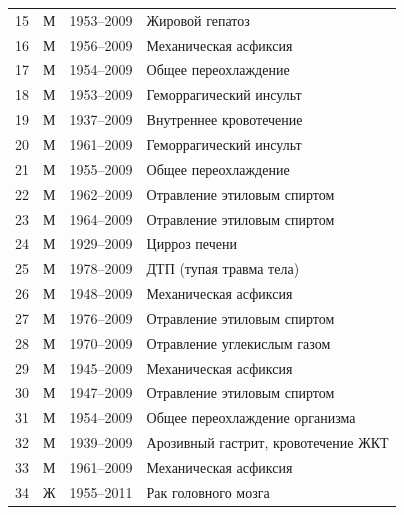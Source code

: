 \begin{table}[p!]
\begin{tabular}{r|c|c|l}
15 & М & 1953--2009 & Жировой гепатоз \\

16 & М & 1956--2009 & Механическая асфиксия \\

17 & М & 1954--2009 & Общее переохлаждение \\

18 & М & 1953--2009 & Геморрагический инсульт \\

19 & М & 1937--2009 & Внутреннее кровотечение \\

20 & М & 1961--2009 & Геморрагический инсульт \\

21 & М & 1955--2009 & Общее переохлаждение \\

22 & М & 1962--2009 & Отравление этиловым спиртом \\

23 & М & 1964--2009 & Отравление этиловым спиртом \\

24 & М & 1929--2009 & Цирроз печени \\

25 & М & 1978--2009 & ДТП (тупая травма тела) \\

26 & М & 1948--2009 & Механическая асфиксия \\

27 & М & 1976--2009 & Отравление этиловым спиртом \\

28 & М & 1970--2009 & Отравление углекислым газом \\

29 & М & 1945--2009 & Механическая асфиксия \\

30 & М & 1947--2009 & Отравление этиловым спиртом \\

31 & М & 1954--2009 & Общее переохлаждение организма \\

32 & М & 1939--2009 & Арозивный гастрит, кровотечение ЖКТ \\

33 & М & 1961--2009 & Механическая асфиксия \\

34 & Ж & 1955--2011 & Рак головного мозга\\


\end{tabular}
\end{table}
